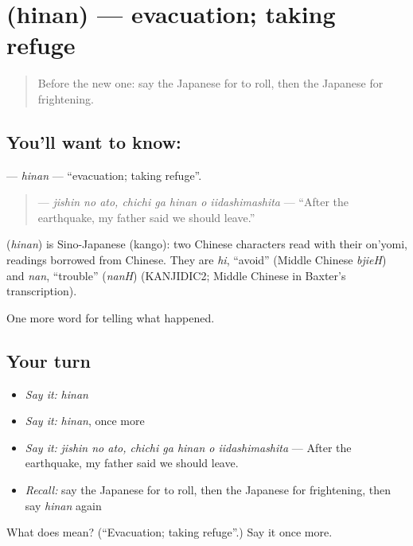 \section[\texorpdfstring{\ja{ひなん} (hinan)}{ひなん (hinan)}]{ (hinan) — evacuation; taking refuge}

\label{lesson:JA-C274-hinan}



\begin{quote}
Before the new one: say the Japanese for to roll, then the Japanese for frightening.
\end{quote}

\subsection*{You'll want to know: }
\textbf{} — \emph{hinan} — \textquotedblleft{}evacuation; taking refuge\textquotedblright{}.

\begin{quote}
\textbf{   } — \emph{jishin no ato, chichi ga hinan o iidashimashita} — \textquotedblleft{}After the earthquake, my father said we should leave.\textquotedblright{}
\end{quote}

\begin{cousinweb}
\textbf{} (\emph{hinan}) is Sino-Japanese (kango): two Chinese characters read with their on'yomi, readings borrowed from Chinese. They are \emph{hi}, \textquotedblleft{}avoid\textquotedblright{} (Middle Chinese \emph{bjieH}) and \emph{nan}, \textquotedblleft{}trouble\textquotedblright{} (\emph{nanH}) (KANJIDIC2; Middle Chinese in Baxter's transcription).
\end{cousinweb}

\begin{grammarlens}[title={What you've built}]
One more word for telling what happened.
\end{grammarlens}

\subsection*{Your turn}
\begin{itemize}
\raggedright
  \item \emph{Say it:} \emph{hinan}
  \item \emph{Say it:} \emph{hinan}, once more
  \item \emph{Say it:} \emph{jishin no ato, chichi ga hinan o iidashimashita} — After the earthquake, my father said we should leave.
  \item \emph{Recall:} say the Japanese for to roll, then the Japanese for frightening, then say \emph{hinan} again
\end{itemize}

\begin{tcolorbox}[breakable,colback=teal!4,colframe=teal!35!black,title={Before you move on}]
What does  mean? (\textquotedblleft{}Evacuation; taking refuge\textquotedblright{}.) Say it once more.
\end{tcolorbox}
